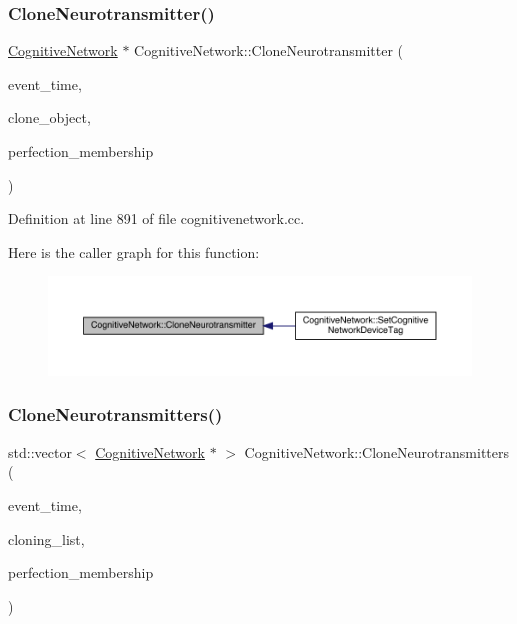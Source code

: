 \subsubsection{\texorpdfstring{Clone\+Neurotransmitter()}{CloneNeurotransmitter()}}
{\footnotesize\ttfamily \hyperlink{class_cognitive_network}{Cognitive\+Network} $\ast$ Cognitive\+Network\+::\+Clone\+Neurotransmitter (\begin{DoxyParamCaption}\item[{std\+::chrono\+::time\+\_\+point$<$ \hyperlink{universe_8h_a0ef8d951d1ca5ab3cfaf7ab4c7a6fd80}{Clock} $>$}]{event\+\_\+time,  }\item[{\hyperlink{class_cognitive_network}{Cognitive\+Network} $\ast$}]{clone\+\_\+object,  }\item[{double}]{perfection\+\_\+membership }\end{DoxyParamCaption})}



Definition at line 891 of file cognitivenetwork.\+cc.

Here is the caller graph for this function\+:
\nopagebreak
\begin{figure}[H]
\begin{center}
\leavevmode
\includegraphics[width=350pt]{class_cognitive_network_af78d31471a121844e4735d809c900502_icgraph}
\end{center}
\end{figure}
\mbox{\label{class_cognitive_network_a2b2d40d179f95ff96e9aa0559234cc31}} 
\subsubsection{\texorpdfstring{Clone\+Neurotransmitters()}{CloneNeurotransmitters()}}
{\footnotesize\ttfamily std\+::vector$<$ \hyperlink{class_cognitive_network}{Cognitive\+Network} $\ast$ $>$ Cognitive\+Network\+::\+Clone\+Neurotransmitters (\begin{DoxyParamCaption}\item[{std\+::chrono\+::time\+\_\+point$<$ \hyperlink{universe_8h_a0ef8d951d1ca5ab3cfaf7ab4c7a6fd80}{Clock} $>$}]{event\+\_\+time,  }\item[{std\+::vector$<$ \hyperlink{class_cognitive_network}{Cognitive\+Network} $\ast$$>$}]{cloning\+\_\+list,  }\item[{double}]{perfection\+\_\+membership }\end{DoxyParamCaption})}



